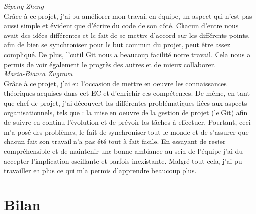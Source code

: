 \textit{Sipeng Zheng}\\

Grâce à ce projet, j'ai pu améliorer mon travail en équipe, un aspect qui n'est pas aussi simple et évident que d'écrire du code de son côté. Chacun d'entre nous avait des idées différentes et le fait de se mettre d'accord sur les différents points, afin de bien se synchroniser pour le but commun du projet, peut être assez compliqué. De plus, l'outil Git nous a beaucoup facilité notre travail. Cela nous a permis de voir également le progrès des autres et de mieux collaborer.\\

\textit{Maria-Bianca Zugravu}\\

Grâce à ce projet, j'ai eu l'occasion de mettre en oeuvre les connaissances théoriques acquises dans cet EC et d'enrichir ces compétences. De même, en tant que chef de projet, j'ai découvert les différentes problématiques liées aux aspects organisationnels, tels que : la mise en oeuvre de la gestion de projet (le Git) afin de suivre en continu l'évolution et de prévoir les tâches à effectuer. Pourtant, ceci m'a posé des problèmes, le fait de synchroniser tout le monde et de s'assurer que chacun fait son travail n'a pas été tout à fait facile. En essayant de rester compréhensible et de maintenir une bonne ambiance au sein de l'équipe j'ai du accepter l'implication oscillante et parfois inexistante. Malgré tout cela, j'ai pu travailler en plus ce qui m'a permis d'apprendre beaucoup plus. 

\section{Bilan}

